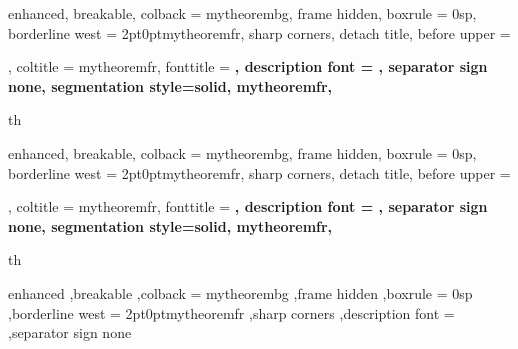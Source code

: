


\setlength{\parindent}{1cm}

{%
	enhanced,
	breakable,
	colback = mytheorembg,
	frame hidden,
	boxrule = 0sp,
	borderline west = {2pt}{0pt}{mytheoremfr},
	sharp corners,
	detach title,
	before upper = \tcbtitle\par\smallskip,
	coltitle = mytheoremfr,
	fonttitle = \bfseries\sffamily,
	description font = \mdseries,
	separator sign none,
	segmentation style={solid, mytheoremfr},
}
{th}

{%
	enhanced,
	breakable,
	colback = mytheorembg,
	frame hidden,
	boxrule = 0sp,
	borderline west = {2pt}{0pt}{mytheoremfr},
	sharp corners,
	detach title,
	before upper = \tcbtitle\par\smallskip,
	coltitle = mytheoremfr,
	fonttitle = \bfseries\sffamily,
	description font = \mdseries,
	separator sign none,
	segmentation style={solid, mytheoremfr},
}
{th}


{%
	enhanced
	,breakable
	,colback = mytheorembg
	,frame hidden
	,boxrule = 0sp
	,borderline west = {2pt}{0pt}{mytheoremfr}
	,sharp corners
	,description font = \mdseries
	,separator sign none
}



